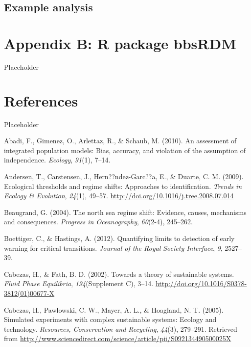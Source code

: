 \documentclass[12pt,twoside,openany]{reedthesis}
\begin{document}
\section{Example analysis}\label{example-analysis}

\chapter*{Appendix B: R package bbsRDM}\label{bbsRDM}

Placeholder

\chapter*{References}\label{references}

Placeholder

\hypertarget{refs}{}
\hypertarget{ref-abadi2010assessment}{}
Abadi, F., Gimenez, O., Arlettaz, R., \& Schaub, M. (2010). An
assessment of integrated population models: Bias, accuracy, and
violation of the assumption of independence. \emph{Ecology},
\emph{91}(1), 7--14.

\hypertarget{ref-andersen_ecological_2009}{}
Andersen, T., Carstensen, J., Hern??ndez-Garc??a, E., \& Duarte, C. M.
(2009). Ecological thresholds and regime shifts: Approaches to
identification. \emph{Trends in Ecology \& Evolution}, \emph{24}(1),
49--57. \url{http://doi.org/10.1016/j.tree.2008.07.014}

\hypertarget{ref-beaugrand2004north}{}
Beaugrand, G. (2004). The north sea regime shift: Evidence, causes,
mechanisms and consequences. \emph{Progress in Oceanography},
\emph{60}(2-4), 245--262.

\hypertarget{ref-boettiger_quantifying_2012}{}
Boettiger, C., \& Hastings, A. (2012). Quantifying limits to detection
of early warning for critical transitions. \emph{Journal of the Royal
Society Interface}, \emph{9}, 2527--39.

\hypertarget{ref-cabezas_towards_2002}{}
Cabezas, H., \& Fath, B. D. (2002). Towards a theory of sustainable
systems. \emph{Fluid Phase Equilibria}, \emph{194}(Supplement C), 3--14.
\url{http://doi.org/10.1016/S0378-3812(01)00677-X}

\hypertarget{ref-cabezas_simulated_2005}{}
Cabezas, H., Pawlowski, C. W., Mayer, A. L., \& Hoagland, N. T. (2005).
Simulated experiments with complex sustainable systems: Ecology and
technology. \emph{Resources, Conservation and Recycling}, \emph{44}(3),
279--291. Retrieved from
\url{http://www.sciencedirect.com/science/article/pii/S092134490500025X}
\end{document}
